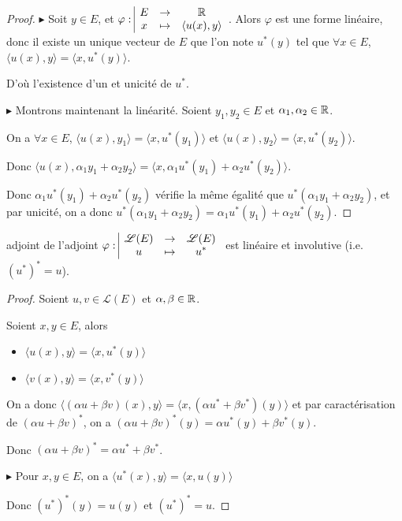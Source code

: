 \begin{proof}
    $\blacktriangleright$ Soit $y \in E$, et $\varphi: \space \begin{array}{|ccc} \displaystyle E & \to & \displaystyle \mathbb{R} \\ \displaystyle x & \mapsto & \displaystyle \langle u(x), y \rangle \end{array}$. Alors $\varphi$ est une forme linéaire, 
    donc il existe un unique vecteur de $E$ que l'on note $u^*(y)$ tel que 
    $\forall x \in E$, $\langle u(x), y \rangle = \langle x, u^*(y) \rangle$.

    D'où l'existence d'un et unicité de $u^*$.

    \avspace $\blacktriangleright$ Montrons maintenant la linéarité. Soient $y_1, y_2 \in E$ et $\alpha_1, \alpha_2 \in \mathbb{R}$. 

    On a $\forall x \in E$, $\langle u(x), y_1 \rangle = \langle x, u^*(y_1) \rangle$ 
    et $\langle u(x), y_2 \rangle = \langle x, u^*(y_2) \rangle$.

    Donc $\langle u(x), \alpha_1 y_1 + \alpha_2 y_2 \rangle = \langle x, \alpha_1 u^*(y_1) + \alpha_2 u^*(y_2) \rangle$.

    Donc $\alpha_1 u^*(y_1) + \alpha_2 u^*(y_2)$ vérifie la même égalité que $u^*(\alpha_1 y_1 + \alpha_2 y_2)$, et par unicité,
    on a donc $u^*(\alpha_1 y_1 + \alpha_2 y_2) = \alpha_1 u^*(y_1) + \alpha_2 u^*(y_2)$.
\end{proof}

\begin{proposition}{adjoint de l'adjoint}{}
    $\varphi: \space \begin{array}{|ccc} \displaystyle \mathscr L(E) & \to & \displaystyle \mathscr L(E) \\ \displaystyle u & \mapsto & \displaystyle u^* \end{array}$ est linéaire et involutive (i.e. $(u^*)^* = u$).
\end{proposition}

\begin{proof}
    Soient $u, v \in \mathscr L(E)$ et $\alpha, \beta \in \mathbb{R}$. 

    Soient $x, y \in E$, alors 
    \begin{itemize}
        \item $\langle u(x), y \rangle = \langle x, u^*(y) \rangle$ 
        \item $\langle v(x), y \rangle = \langle x, v^*(y) \rangle$
    \end{itemize}

    On a donc $\langle (\alpha u + \beta v)(x), y \rangle = \langle x, (\alpha u^* + \beta v^*)(y) \rangle$ 
    et par caractérisation de $(\alpha u + \beta v)^*$, on a 
    $(\alpha u + \beta v)^*(y) = \alpha u^*(y) + \beta v^*(y)$.

    Donc $(\alpha u + \beta v)^* = \alpha u^* + \beta v^*$.

    \avspace $\blacktriangleright$ Pour $x, y \in E$, on a 
    $\langle u^*(x), y \rangle = \langle x, u(y) \rangle$

    Donc $(u^*)^*(y) = u(y)$ et $(u^*)^* = u$.
\end{proof}


